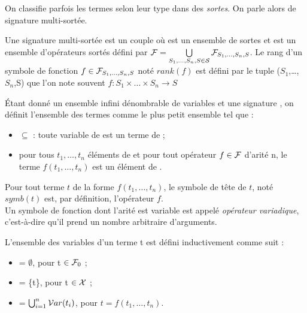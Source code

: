 On classifie parfois les termes selon leur type dans des \emph{sortes}. On
parle alors de signature multi-sortée.

\begin{definition}
Une signature multi-sortée est un couple \SF où \caS est un ensemble de sortes
et \caF est un ensemble d'opérateurs sortés défini par $\mathcal{F} = \bigcup
 \limits_{S_1,\ldots,S_n, S \in \mathcal{S}} \mathcal{F}_{S_1,\ldots,S_n,S}$. Le rang d'un
symbole de fonction $f \in \mathcal{F}_{S_1,\ldots,S_n,S}$ noté $rank(f)$ est défini
par le tuple ($S_1$,\ldots,$S_n$,S) que l'on note souvent $f : S_1 \times
\ldots \times S_n \rightarrow S$
\end{definition}

\begin{definition}[Terme]
Étant donné un ensemble infini dénombrable de variables \caX et une signature
\caF, on définit l'ensemble des termes \TFX comme le plus petit ensemble tel
que :
\begin{itemize}
\item \caX $\subseteq$ \TFX : toute variable de \caX est un terme de \TFX ;
\item pour tous $t_1,\ldots,t_n$ éléments de \TFX et pour tout opérateur $f \in
  \mathcal{F}$ d'arité n, le terme $f(t_1,\ldots,t_n)$ est un élément de \TFX.
\end{itemize}
\end{definition}
Pour tout terme $t$ de la forme $f(t_1,\ldots,t_n)$, le symbole de tête de $t$,
noté $symb(t)$ est, par définition, l'opérateur $f$.\\
Un symbole de fonction dont l'arité est variable est appelé \emph{opérateur
variadique}, c'est-à-dire qu'il prend un nombre arbitraire d'arguments.



\begin{definition}
L'ensemble  des variables d'un terme t est défini inductivement comme
suit :
\begin{itemize}
  \item {} = $\emptyset$, pour t $\in \mathcal{F}_0$ ;
  \item {} = \{t\}, pour t $\in \mathcal{X}$ ;
  \item {} = $\bigcup_{i=1}^n \mathcal{V} ar(t_i)$, pour $t = f(t_1, \ldots, t_n)$.
\end{itemize}
\end{definition}

